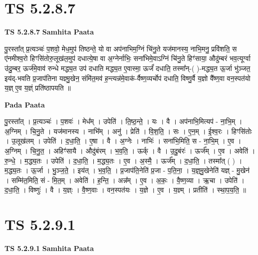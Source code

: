 \documentclass[17pt]{extarticle}
\begin{document}

\section{ TS 5.2.8.7 }

\textbf{TS 5.2.8.7 } \newline
\textbf{Samhita Paata} \newline

पु॒रस्ता᳚त् प्र॒त्यञ्चः॑ प॒शवो॒ मेध॒मुप॑ तिष्ठन्ते॒ यो वा अप॑नाभिम॒ग्निं चि॑नु॒ते यज॑मानस्य॒ नाभि॒मनु॒ प्रवि॑शति॒ स ए॑नमीश्व॒रो हिꣳसि॑तोरु॒लूख॑ल॒मुप॑ दधात्ये॒षा वा अ॒ग्नेर्नाभिः॒ सना॑भिमे॒वाऽग्निं चि॑नु॒ते हिꣳ॑साया॒ औदु॑म्बरं भव॒त्यूर्ग्वा उ॑दु॒म्बर॒ ऊर्ज॑मे॒वाव॑ रुन्धे मद्ध्य॒त उप॑ दधाति मद्ध्य॒त ए॒वास्मा॒ ऊर्जं॑ दधाति॒ तस्मा᳚न्-( )-मद्ध्य॒त ऊ॒र्जा भु॑ञ्जत॒ इय॑द्-भवति प्र॒जाप॑तिना यज्ञ्मु॒खेन॒ संमि॑त॒मव॑ ह॒न्त्यन्न॑मे॒वाक॑-र्वैष्ण॒व्यर्चोप॑ दधाति॒ विष्णु॒र्वै य॒ज्ञो वै᳚ष्ण॒वा वन॒स्पत॑यो य॒ज्ञ् ए॒व य॒ज्ञ्ं प्रति॑ष्ठापयति ॥ \newline

\textbf{Pada Paata} \newline

पु॒रस्ता᳚त् । प्र॒त्यञ्चः॑ । प॒शवः॑ । मेध᳚म् । उपेति॑ । ति॒ष्ठ॒न्ते॒ । यः । वै । अप॑नाभि॒मित्यप॑ - ना॒भि॒म् । अ॒ग्निम् । चि॒नु॒ते । यज॑मानस्य । नाभि᳚म् । अनु॑ । प्रेति॑ । वि॒श॒ति॒ । सः । ए॒न॒म् । ई॒श्व॒रः । हिꣳसि॑तोः । उ॒लूख॑लम् । उपेति॑ । द॒धा॒ति॒ । ए॒षा । वै । अ॒ग्नेः । नाभिः॑ । सना॑भि॒मिति॒ स - ना॒भि॒म् । ए॒व । अ॒ग्निम् । चि॒नु॒त॒ । अहिꣳ॑सायै । औदु॑बंरम् । भ॒व॒ति॒ । ऊर्क् । वै । उ॒दु॒बंरः॑ । ऊर्ज᳚म् । ए॒व । अवेति॑ । रु॒न्धे॒ । म॒द्ध्य॒तः । उपेति॑ । द॒धा॒ति॒ । म॒द्ध्य॒तः । ए॒व । अ॒स्मै॒ । ऊर्ज᳚म् । द॒धा॒ति॒ । तस्मा᳚त् ( ) । म॒द्ध्य॒तः । ऊ॒र्जा । भु॒ञ्ज॒ते॒ । इय॑त् । भ॒व॒ति॒ । प्र॒जाप॑ति॒नेति॑ प्र॒जा - प॒ति॒ना॒ । य॒ज्ञ्॒मु॒खेनेति॑ यज्ञ् - मु॒खेन॑ । सम्मि॑त॒मिति॒ सं - मि॒त॒म् । अवेति॑ । ह॒न्ति॒ । अन्न᳚म् । ए॒व । अ॒कः॒ । वै॒ष्ण॒व्या । ऋ॒चा । उपेति॑ । द॒धा॒ति॒ । विष्णुः॑ । वै । य॒ज्ञ्ः । वै॒ष्ण॒वाः । वन॒स्पत॑यः । य॒ज्ञे । ए॒व । य॒ज्ञ्म् । प्रतीति॑ । स्था॒प॒य॒ति॒ ॥  \newline





\section{ TS 5.2.9.1 }

\textbf{TS 5.2.9.1 } \newline
\textbf{Samhita Paata} \newline
\end{document}
